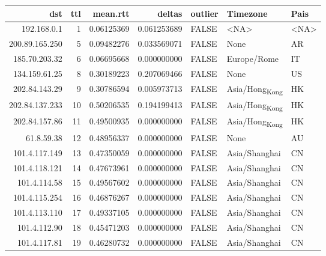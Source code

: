 \documentclass[11pt]{article}
\author{nsm}
\date{\today}
\title{}
\begin{document}
\tableofcontents

\begin{center}
\begin{tabular}{rrrrlll}
dst & ttl & mean.rtt & deltas & outlier & Timezone & Pais\\
\hline
192.168.0.1 & 1 & 0.06125369 & 0.061253689 & FALSE & <NA> & <NA>\\
200.89.165.250 & 5 & 0.09482276 & 0.033569071 & FALSE & None & AR\\
185.70.203.32 & 6 & 0.06695668 & 0.000000000 & FALSE & Europe/Rome & IT\\
134.159.61.25 & 8 & 0.30189223 & 0.207069466 & FALSE & None & US\\
202.84.143.29 & 9 & 0.30786594 & 0.005973713 & FALSE & Asia/Hong\textsubscript{Kong} & HK\\
202.84.137.233 & 10 & 0.50206535 & 0.194199413 & FALSE & Asia/Hong\textsubscript{Kong} & HK\\
202.84.157.86 & 11 & 0.49500935 & 0.000000000 & FALSE & Asia/Hong\textsubscript{Kong} & HK\\
61.8.59.38 & 12 & 0.48956337 & 0.000000000 & FALSE & None & AU\\
101.4.117.149 & 13 & 0.47350059 & 0.000000000 & FALSE & Asia/Shanghai & CN\\
101.4.118.121 & 14 & 0.47673961 & 0.000000000 & FALSE & Asia/Shanghai & CN\\
101.4.114.58 & 15 & 0.49567602 & 0.000000000 & FALSE & Asia/Shanghai & CN\\
101.4.115.254 & 16 & 0.46876267 & 0.000000000 & FALSE & Asia/Shanghai & CN\\
101.4.113.110 & 17 & 0.49337105 & 0.000000000 & FALSE & Asia/Shanghai & CN\\
101.4.112.90 & 18 & 0.45471203 & 0.000000000 & FALSE & Asia/Shanghai & CN\\
101.4.117.81 & 19 & 0.46280732 & 0.000000000 & FALSE & Asia/Shanghai & CN\\
\end{tabular}
\end{center}
\end{document}
